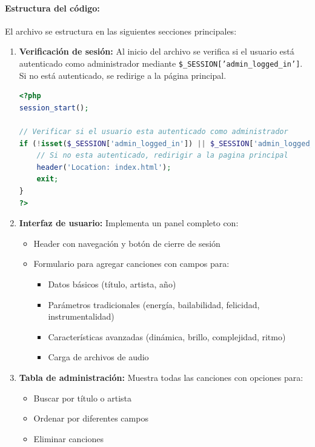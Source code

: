 \documentclass[a4paper,12pt]{article}
\begin{document}
\paragraph{Estructura del código:}
El archivo se estructura en las siguientes secciones principales:

\begin{enumerate}
    \item \textbf{Verificación de sesión:} Al inicio del archivo se verifica si el usuario está autenticado como administrador mediante \texttt{\$\_SESSION['admin\_logged\_in']}. Si no está autenticado, se redirige a la página principal.
    
    \begin{lstlisting}[language=PHP]
<?php
session_start();

// Verificar si el usuario esta autenticado como administrador
if (!isset($_SESSION['admin_logged_in']) || $_SESSION['admin_logged_in'] !== true) {
    // Si no esta autenticado, redirigir a la pagina principal
    header('Location: index.html');
    exit;
}
?>
    \end{lstlisting}
    
    \item \textbf{Interfaz de usuario:} Implementa un panel completo con:
    \begin{itemize}
        \item Header con navegación y botón de cierre de sesión
        \item Formulario para agregar canciones con campos para:
        \begin{itemize}
            \item Datos básicos (título, artista, año)
            \item Parámetros tradicionales (energía, bailabilidad, felicidad, instrumentalidad)
            \item Características avanzadas (dinámica, brillo, complejidad, ritmo)
            \item Carga de archivos de audio
        \end{itemize}
    \end{itemize}
    
    \item \textbf{Tabla de administración:} Muestra todas las canciones con opciones para:
    \begin{itemize}
        \item Buscar por título o artista
        \item Ordenar por diferentes campos
        \item Eliminar canciones
    \end{itemize}
    

\end{enumerate}
\end{document}
